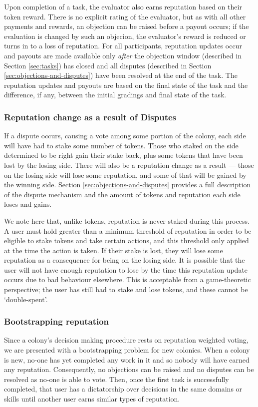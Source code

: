 Upon completion of a task, the evaluator also earns reputation based on their token reward. There is no explicit rating of the evaluator, but as with all other payments and rewards, an objection can be raised before a payout occurs; if the evaluation is changed by such an objecion, the evaluator's reward is reduced or turns in to a loss of reputation. For all participants, reputation updates occur and payouts are made available only \emph{after} the objection window (described in Section \ref{sec:tasks}) has closed and all disputes  (described in Section \ref{sec:objections-and-disputes}) have been resolved at the end of the task. The reputation updates and payouts are based on the final state of the task and the difference, if any, between the initial gradings and final state of the task.

\subsubsection{Reputation change as a result of Disputes}\label{sec:earning-rep-in-disputes}
If a dispute occurs, causing a vote among some portion of the colony, each side will have had to stake some number of tokens. Those who staked on the side determined to be right gain their stake back, plus some tokens that have been lost by the losing side. There will also be a reputation change as a result --- those on the losing side will lose some reputation, and some of that will be gained by the winning side. Section \ref{sec:objections-and-disputes} provides a full description of the dispute mechanism and the amount of tokens and reputation each side loses and gains.

We note here that, unlike tokens, reputation is never staked during this process. A user must hold greater than a minimum threshold of reputation in order to be eligible to stake tokens and take certain actions, and this threshold only applied at the time the action is taken. If their stake is lost, they will lose some reputation as a consequence for being on the losing side. It is possible that the user will not have enough reputation to lose by the time this reputation update occurs due to bad behaviour elsewhere. This is acceptable from a game-theoretic perspective; the user has still had to stake and lose tokens, and these cannot be `double-spent'.

\subsubsection{Bootstrapping reputation}\label{sec:bootstrapping-rep}
Since a colony's decision making procedure rests on reputation weighted voting, we are presented with a bootstrapping problem for new colonies. When a colony is new, no-one has yet completed any work in it and so nobody will have earned any reputation. Consequently, no objections can be raised and no disputes can be resolved as no-one is able to vote. Then, once the first task is successfully completed, that user has a dictatorship over decisions in the same domains or skills until another user earns similar types of reputation.

